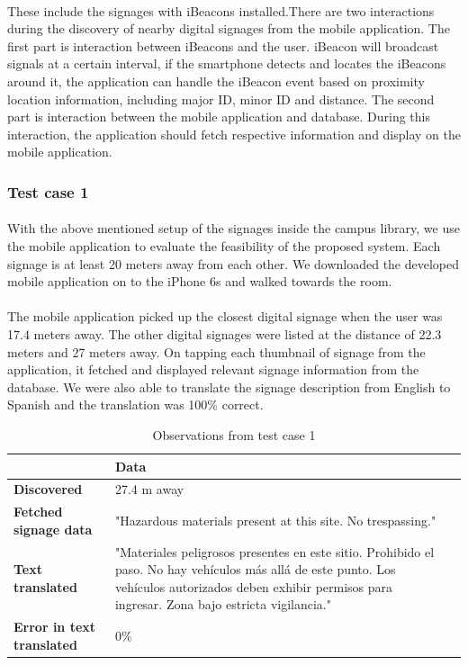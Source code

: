 \documentclass[12pt]{article}
\begin{document}
\paragraph{}These include the signages with iBeacons installed.There are two interactions during the discovery of nearby digital signages from the mobile application. The first part is interaction between iBeacons and the user. iBeacon will broadcast signals at a certain interval, if the smartphone detects and locates the iBeacons around it,  the application can handle the iBeacon event based on proximity location information, including major ID, minor ID and distance. The second part is interaction between the mobile application and database. During this interaction, the application should fetch respective information and display on the mobile application.

\subsubsection{Test case 1}
\label{oneone}
\paragraph{}With the above mentioned setup of the signages inside the campus library, we use the mobile application to evaluate the feasibility of the proposed system. Each signage is at least 20 meters away from each other. We downloaded the developed mobile application on to the iPhone 6s and walked towards the room.

\paragraph{}The mobile application picked up the closest digital signage when the user was 17.4 meters away. The other digital signages were listed at the distance of 22.3 meters and 27 meters away. On tapping each thumbnail of signage from the application, it fetched and displayed relevant signage information from the database. We were also able to translate the signage description from English to Spanish and the translation was 100\% correct.

\begin{table}%
    \centering
    \caption{Observations from test case 1} 
    \label{my-label}
       \begin{tabular}{|p{30mm}|p{55mm}|p{35mm}|}
 \hline
  & \textbf{Data}  \\ [0.5ex] 
 \hline\hline
 \textbf{Discovered} & 27.4 m away  \\ 
 \hline
 \textbf{Fetched signage data} & "Hazardous materials present at this site. No trespassing."  \\
 \hline
 \textbf{Text translated} &  "Materiales peligrosos presentes en este sitio. Prohibido el paso. No hay vehículos más allá de este punto. Los vehículos autorizados deben exhibir permisos para ingresar. Zona bajo estricta vigilancia." \\
 \hline
 \textbf{Error in text translated} & 0\%   \\ [1ex] 
 \hline
    \end{tabular}
\end{table}
\end{document}
